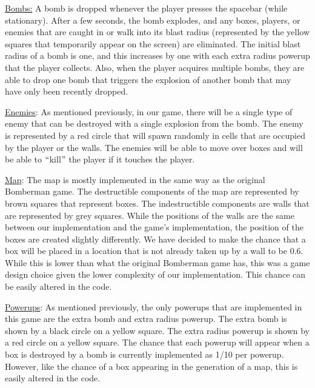 \documentclass[12pt]{article}
\begin{document}
\vspace{\baselineskip}
\uline{Bombs:} A bomb is dropped whenever the player presses the spacebar (while stationary). After a few seconds, the bomb explodes, and any boxes, players, or enemies that are caught in or walk into its blast radius (represented by the yellow squares that temporarily appear on the screen) are eliminated. The initial blast radius of a bomb is one, and this increases by one with each extra radius powerup that the player collects. Also, when the player acquires multiple bombs, they are able to drop one bomb that triggers the explosion of another bomb that may have only been recently dropped.\par


\vspace{\baselineskip}
\uline{Enemies}: As mentioned previously, in our game, there will be a single type of enemy that can be destroyed with a single explosion from the bomb. The enemy is represented by a red circle that will spawn randomly in cells that are occupied by the player or the walls. The enemies will be able to move over boxes and will be able to $``$kill$"$  the player if it touches the player.\par


\vspace{\baselineskip}
\uline{Map}: The map is mostly implemented in the same way as the original Bomberman game. The destructible components of the map are represented by brown squares that represent boxes. The indestructible components are walls that are represented by grey squares. While the positions of the walls are the same between our implementation and the game’s implementation, the position of the boxes are created slightly differently. We have decided to make the chance that a box will be placed in a location that is not already taken up by a wall to be 0.6. While this is lower than what the original Bomberman game has, this was a game design choice given the lower complexity of our implementation. This chance can be easily altered in the code.\par


\vspace{\baselineskip}
\uline{Powerups}: As mentioned previously, the only powerups that are implemented in this game are the extra bomb and extra radius powerup. The extra bomb is shown by a black circle on a yellow square. The extra radius powerup is shown by a red circle on a yellow square. The chance that each powerup will appear when a box is destroyed by a bomb is currently implemented as 1/10 per powerup. However, like the chance of a box appearing in the generation of a map, this is easily altered in the code.\par
\end{document}
